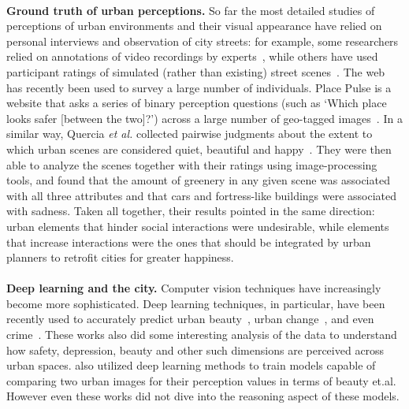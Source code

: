 \mbox{}\\
\noindent
\textbf{Ground truth of urban perceptions.} So far the most detailed studies of perceptions of urban environments and their visual appearance have relied on personal interviews and observation of city streets: for example, some researchers relied on annotations of video recordings by experts~\cite{sampson04seeing}, while others have used participant ratings of simulated (rather than existing) street scenes~\cite{lindal2012}. The web has recently been used to survey a large number of individuals. Place Pulse is a website that asks a series of binary perception questions (such as `Which place looks safer [between the two]?') across a large number of geo-tagged images~\cite{salesses2013collaborative}. In a similar way, Quercia \emph{et al.} collected pairwise judgments about the extent to which urban scenes are considered quiet, beautiful and happy~\cite{quercia2014aesthetic}. They were then able to analyze the scenes together with their ratings using image-processing tools, and found that the amount of greenery in any given scene was associated with all three attributes and that cars and fortress-like buildings were associated with sadness. Taken all together, their results pointed in the same direction: urban elements that hinder social interactions were undesirable, while elements that increase interactions were the ones that should be integrated by urban planners to retrofit cities for greater happiness.
\mbox{}\\

\mbox{}\\
\noindent
\textbf{Deep learning and the city.} Computer vision techniques have increasingly become more sophisticated. Deep learning techniques, in particular, have been recently used to accurately predict urban beauty~\cite{dubey2016deep,seresinhe2017using}, urban change~\cite{naik2017computer}, and even crime~\cite{DeNadai16,arietta2014city}. These works also did some interesting analysis of the data to understand how safety, depression, beauty and other such dimensions are perceived across urban spaces.  \cite{dubey2016deep} also utilized deep learning methods to train models capable of comparing two urban images for their perception values in terms of beauty et.al.  However even these works did not dive into the reasoning aspect of these models.
\mbox{}\\

